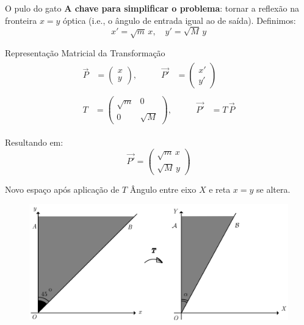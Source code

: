 \documentclass{beamer}
\begin{document}
\begin{frame}{O pulo do gato}
  \textbf{A chave para simplificar o problema}: tornar a reflexão na fronteira $x=y$ óptica (i.e., o ângulo de entrada igual ao de saída). Definimos:
  \begin{equation*}
    x' = \sqrt{m}\,x,\quad y' = \sqrt{M}\,y
  \end{equation*}
\end{frame}

\begin{frame}{Representação Matricial da Transformação}
  \begin{gather*}
    \begin{alignedat}{2}
      \vec{P} &= \begin{pmatrix} x \\ y \end{pmatrix}, &\qquad \vec{P'} &= \begin{pmatrix} x' \\ y' \end{pmatrix}
    \end{alignedat}
    \\[2ex] %
    \begin{alignedat}{2}
      T &= \begin{pmatrix} \sqrt{m} & 0 \\ 0 & \sqrt{M} \end{pmatrix}, &\qquad \vec{P'} &= T\,\vec{P}
    \end{alignedat}
  \end{gather*}

  Resultando em:
  \begin{equation*}
    \vec{P'}=\begin{pmatrix}\sqrt m\,x\\\sqrt M\,y\end{pmatrix}
  \end{equation*}
\end{frame}

\begin{frame}{Novo espaço após aplicação de $T$}
  Ângulo entre eixo $X$ e reta $x=y$ se altera.
  \begin{figure}
    \centering
    \includegraphics[width=1\textwidth]{images/image-3.png}
  \end{figure}
\end{frame}
\end{document}
